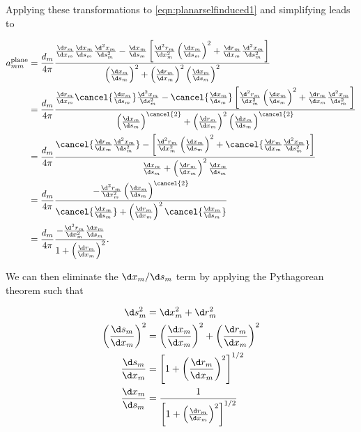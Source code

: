 Applying these transformations to \cref{eqn:planarselfinduced1} and simplifying leads to

\begin{align}
    a^\text{plane}_{mm} &= \frac{d_m}{4 \pi}
    \frac{
        \frac{\d r_m}{\d x_m}\frac{\d x_m}{\d s_m} \frac{\d^2 x_m}{\d s_m^2}
        -\frac{\d x_m}{\d s_m} \left[\frac{\d^2 r_m}{\d x_m^2}\left(\frac{\d x_m}{\d s_m}\right)^2
        + \frac{\d r_m}{\d x_m}\frac{\d^2 x_m}{\d s_m^2} \right]
    }{
        \left(\frac{\d x_m}{\d s_m}\right)^2
        + \left(\frac{\d r_m}{\d x_m}\right)^2\left(\frac{\d x_m}{\d s_m}\right)^2
    } \\
%
    &= \frac{d_m}{4 \pi}
    \frac{
        \frac{\d r_m}{\d x_m}\cancel{\frac{\d x_m}{\d s_m}} \frac{\d^2 x_m}{\d s_m^2}
        - \cancel{\frac{\d x_m}{\d s_m}}  \left[\frac{\d^2 r_m}{\d x_m^2}\left(\frac{\d x_m}{\d s_m}\right)^2
        + \frac{\d r_m}{\d x_m}\frac{\d^2 x_m}{\d s_m^2} \right]
    }{
        \left(\frac{\d x_m}{\d s_m}\right)^{\cancel{2}}
        + \left(\frac{\d r_m}{\d x_m}\right)^2\left(\frac{\d x_m}{\d s_m}\right)^{\cancel{2}}
    } \\
%
    &= \frac{d_m}{4 \pi}
    \frac{
        \cancel{\frac{\d r_m}{\d x_m} \frac{\d^2 x_m}{\d s_m^2}}
        -  \left[\frac{\d^2 r_m}{\d x_m^2}\left(\frac{\d x_m}{\d s_m}\right)^2
        + \cancel{\frac{\d r_m}{\d x_m} \frac{\d^2 x_m}{\d s_m^2}} \right]
    }{
        \frac{\d x_m}{\d s_m}
        + \left(\frac{\d r_m}{\d x_m}\right)^2 \frac{\d x_m}{\d s_m}
    } \\
%
    &= \frac{d_m}{4 \pi}
    \frac{
        - \frac{\d^2 r_m}{\d x_m^2}\left(\frac{\d x_m}{\d s_m}\right)^{\cancel{2}}
    }{
        \cancel{\frac{\d x_m}{\d s_m}}
        + \left(\frac{\d r_m}{\d x_m}\right)^2\cancel{\frac{\d x_m}{\d s_m}}
    } \\
%
\label{eqn:planarselfinduced2}
    &= \frac{d_m}{4 \pi}
    \frac{
        - \frac{\d^2 r_m}{\d x_m^2} \frac{\d x_m}{\d s_m}
    }{
        1 + \left(\frac{\d r_m}{\d x_m}\right)^2
    }.
\end{align}

\noindent We can then eliminate the \(\d x_m/ \d s_m\) term by applying the Pythagorean theorem such that

\begin{align}
    \d s_m^2 &= \d x_m^2 + \d r_m^2 \\
    \left(\frac{\d s_m}{\d x_m}\right)^2 &= \left(\frac{\d x_m}{\d x_m}\right)^2 + \left(\frac{\d r_m}{\d x_m}\right)^2 \\
    \frac{\d s_m}{\d x_m} &= \left[1 + \left(\frac{\d r_m}{\d x_m}\right)^2\right]^{1/2} \\
    \frac{\d x_m}{\d s_m} &= \frac{1}{\left[1 + \left(\frac{\d r_m}{\d x_m}\right)^2\right]^{1/2} }
\end{align}

